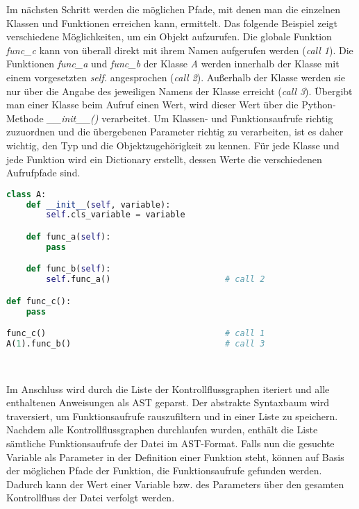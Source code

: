 \documentclass[german,bachelor]{swsLeipzig}
\begin{document}
Im nächsten Schritt werden die möglichen Pfade, mit denen man die einzelnen Klassen und Funktionen erreichen kann, ermittelt.
Das folgende Beispiel zeigt verschiedene Möglichkeiten, um ein Objekt aufzurufen.
Die globale Funktion \textit{func\_c} kann von überall direkt mit ihrem Namen aufgerufen werden (\textit{call 1}).
Die Funktionen \textit{func\_a} und \textit{func\_b} der Klasse \textit{A} werden innerhalb der Klasse mit einem vorgesetzten
\textit{self.} angesprochen (\textit{call 2}).
Außerhalb der Klasse werden sie nur über die Angabe des jeweiligen Namens der Klasse erreicht (\textit{call 3}).
Übergibt man einer Klasse beim Aufruf einen Wert, wird dieser Wert über die Python-Methode \textit{\_\_init\_\_()} verarbeitet.
Um Klassen- und Funktionsaufrufe richtig zuzuordnen und die übergebenen Parameter richtig zu verarbeiten,
ist es daher wichtig, den Typ und die Objektzugehörigkeit zu kennen.
Für jede Klasse und jede Funktion wird ein Dictionary erstellt, dessen Werte die verschiedenen Aufrufpfade sind. \\

\noindent\begin{minipage}{\linewidth}
\begin{lstlisting}[language=Python, frame=single, basicstyle=\small, label=aufrufpfade, caption={Mögliche Aufrufpfade von Klassen und Funktionen},captionpos=b]
class A:
    def __init__(self, variable):
        self.cls_variable = variable

    def func_a(self):
        pass

    def func_b(self):
        self.func_a()                       # call 2

def func_c():
    pass

func_c()                                    # call 1
A(1).func_b()                               # call 3
\end{lstlisting}
\end{minipage}
\

Im Anschluss wird durch die Liste der Kontrollflussgraphen iteriert und alle enthaltenen Anweisungen als AST geparst.
Der abstrakte Syntaxbaum wird traversiert, um Funktionsaufrufe rauszufiltern und in einer Liste zu speichern.
Nachdem alle Kontrollflussgraphen durchlaufen wurden, enthält die Liste sämtliche Funktionsaufrufe der Datei im AST-Format.
Falls nun die gesuchte Variable als Parameter in der Definition einer Funktion steht, können auf Basis der möglichen Pfade
der Funktion, die Funktionsaufrufe gefunden werden.
Dadurch kann der Wert einer Variable bzw. des Parameters über den gesamten Kontrollfluss der Datei verfolgt werden.\\
\end{document}
